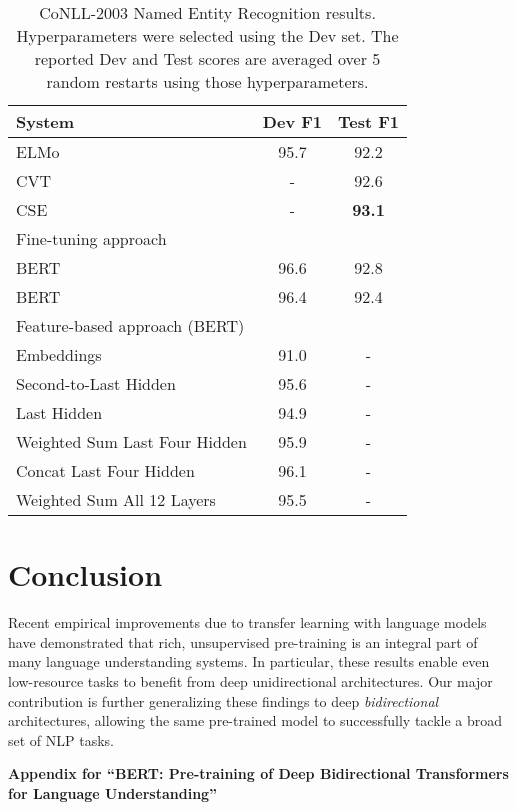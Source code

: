 \documentclass[11pt,a4paper]{article}
\newcommand\bertbase{BERT\xspace}
\newcommand\bertlarge{BERT\xspace}
\begin{document}
\begin{table}[t]
\small
\centering
 \begin{tabular}{@{}lcc@{}}
\toprule
System & Dev F1 & Test F1 \\
\midrule
ELMo~\cite{peters-etal:2018:_deep}& 95.7 & 92.2 \\
CVT~\cite{clark2018semi} & - & 92.6 \\
CSE~\cite{akbik2018contextual} & - & {\bf 93.1} \\
\midrule
Fine-tuning approach & & \\
\;\;\;\bertlarge  & 96.6 & 92.8 \\
\;\;\;\bertbase& 96.4 & 92.4 \\
\midrule
Feature-based approach (\bertbase) &  &  \\
\;\;\;Embeddings & 91.0 &- \\
\;\;\;Second-to-Last Hidden   & 95.6&- \\
\;\;\;Last Hidden            & 94.9&- \\
\;\;\;Weighted Sum Last Four Hidden        & 95.9&- \\
\;\;\;Concat Last Four Hidden        & 96.1&- \\
\;\;\;Weighted Sum All 12 Layers        & 95.5&- \\
\bottomrule
\end{tabular}
\caption{CoNLL-2003 Named Entity Recognition results. Hyperparameters were selected using the Dev set. The reported Dev and Test scores are averaged over 5 random restarts using those hyperparameters.
}
\label{tab:ner_results}    
\label{tab:pretrained_embeddings}    
\end{table}  
\section{Conclusion}
Recent empirical improvements due to transfer learning with language models have demonstrated that rich, unsupervised pre-training is an integral part of many language understanding systems. In particular, these results enable even low-resource tasks to benefit from deep unidirectional architectures. Our major contribution is further generalizing these findings to deep \emph{bidirectional} architectures, allowing the same pre-trained model to successfully tackle a broad set of NLP tasks.
 



\appendix                                     
\begin{center}
{\bf \large{
    Appendix for ``BERT: Pre-training of Deep Bidirectional Transformers for Language Understanding''}}
\end{center}
\end{document}
